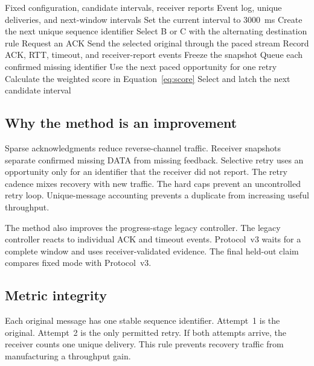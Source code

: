 \documentclass[11pt]{article}
\begin{document}
\begin{algorithm}[H]
\caption{Protocol~v3 sender}\label{alg:protocol-v3}
\footnotesize
\begin{algorithmic}[1]
\Require Fixed configuration, candidate intervals, receiver reports
\Ensure Event log, unique deliveries, and next-window intervals
\State Set the current interval to 3000~ms
  \State Create the next unique sequence identifier
  \State Select B or C with the alternating destination rule
    \State Request an ACK
  \EndIf
  \State Send the selected original through the paced stream
  \State Record ACK, RTT, timeout, and receiver-report events
    \State Freeze the snapshot
    \State Queue each confirmed missing identifier
  \EndIf
    \State Use the next paced opportunity for one retry
  \EndIf
    \State Calculate the weighted score in Equation~\ref{eq:score}
    \State Select and latch the next candidate interval
  \EndIf
\EndWhile
\end{algorithmic}
\end{algorithm}

\subsection{Why the method is an improvement}\label{sec:prop-justification}
\noindent
Sparse acknowledgments reduce reverse-channel traffic.
Receiver snapshots separate confirmed missing DATA from missing feedback.
Selective retry uses an opportunity only for an identifier that the receiver did not report.
The retry cadence mixes recovery with new traffic.
The hard caps prevent an uncontrolled retry loop.
Unique-message accounting prevents a duplicate from increasing useful throughput.

The method also improves the progress-stage legacy controller.
The legacy controller reacts to individual ACK and timeout events.
Protocol~v3 waits for a complete window and uses receiver-validated evidence.
The final held-out claim compares fixed mode with Protocol~v3.

\subsection{Metric integrity}\label{sec:prop-integrity}
\noindent
Each original message has one stable sequence identifier.
Attempt~1 is the original.
Attempt~2 is the only permitted retry.
If both attempts arrive, the receiver counts one unique delivery.
This rule prevents recovery traffic from manufacturing a throughput gain.
\end{document}
